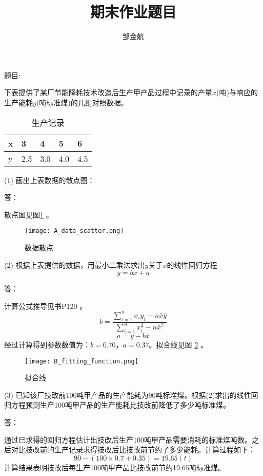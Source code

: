 \documentclass{article}
\title{\heiti 期末作业题目}
\author{邹金航}
\begin{document}
\maketitle
题目:

下表提供了某厂节能降耗技术改造后生产甲产品过程中记录的产量$x$(吨)与响应的生产能耗$y$(吨标准煤)的几组对照数据。

\begin{table}[h]
	\centering
	\caption{生产记录}\label{table-1}
	\begin{tabular}{|p{1.5cm}|p{1.5cm}|p{1.5cm}|p{1.5cm}|p{1.5cm}|}
		\hline
		x & 3 & 4 & 5 & 6 \\
		\hline
		y & 2.5 & 3.0 & 4.0 & 4.5 \\
		\hline
	\end{tabular}
\end{table}

(1) 画出上表数据的散点图：

答：

散点图见图\ref{fig-1} 。
	
\begin{figure}[h]

	\centering
	\texttt{[image: A\_data\_scatter.png]}
	\caption{数据散点}\label{fig-1}
	
\end{figure}
(2) 根据上表提供的数据，用最小二乘法求出$y$关于$x$的线性回归方程
$$y = bx + a$$

答：

计算公式推导见书P120 。
\begin{equation}
	b = \frac{\sum_{i=1}^n x_i y_i - n\bar{x}\bar{y}}{\sum_{i=1}^n x_i^2 - n \bar{x} ^2}\label{1}
\end{equation}
\begin{equation}
	a = \bar{y} - b \bar{x}\label{2}
\end{equation}
经过计算得到参数数值为：$b = 0.70$，$a = 0.37$。拟合线见图 \ref{fig-2} 。

\begin{figure}[h]
	\centering
	\texttt{[image: B\_fitting\_function.png]}
	\caption{拟合线}\label{fig-2}
	
\end{figure}

(3) 已知该厂技改前100吨甲产品的生产能耗为90吨标准煤。根据(2)求出的线性回归方程预测生产100吨甲产品的生产能耗比技改前降低了多少吨标准煤。

答：

通过已求得的回归方程估计出技改后生产100吨甲产品需要消耗的标准煤吨数。之后对比技改前的生产记录求得技改后比技改前节约了多少能耗。计算过程如下：
$$90 - (100 \times 0.7 + 0.35) = 19.65 (t)$$
计算结果表明技改后每生产100吨甲产品比技改前节约19.65吨标准煤。
\end{document}
